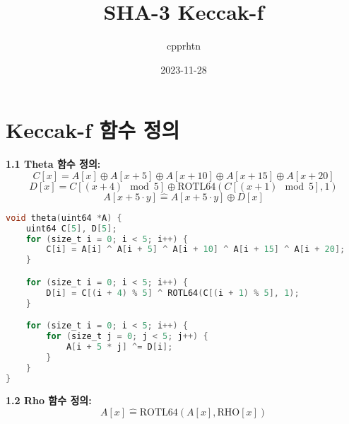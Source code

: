\documentclass[a4paper,12pt]{article} %
\title{SHA-3 \space{} Keccak-f}
\author{cpprhtn}
\date{2023-11-28} %
\begin{document}
\maketitle %

\section{Keccak-f 함수 정의} %
\vspace{2mm}


\textbf{1.1 Theta 함수 정의:}
\[
    C[x] = A[x] \oplus A[x + 5] \oplus A[x + 10] \oplus A[x + 15] \oplus A[x + 20]
\]
\[
    D[x] = C[(x + 4) \mod 5] \oplus \text{{ROTL64}}(C[(x + 1) \mod 5], 1)
\]
\[
    A[x + 5 \cdot y] \hat{=} A[x + 5 \cdot y] \oplus D[x]
\]

\begin{lstlisting}[language=C, caption={Theta 함수}]
void theta(uint64 *A) {
    uint64 C[5], D[5];
    for (size_t i = 0; i < 5; i++) {
        C[i] = A[i] ^ A[i + 5] ^ A[i + 10] ^ A[i + 15] ^ A[i + 20];
    }

    for (size_t i = 0; i < 5; i++) {
        D[i] = C[(i + 4) % 5] ^ ROTL64(C[(i + 1) % 5], 1);
    }

    for (size_t i = 0; i < 5; i++) {
        for (size_t j = 0; j < 5; j++) {
            A[i + 5 * j] ^= D[i];
        }
    }
}
\end{lstlisting}
\vspace{5mm}
\textbf{1.2 Rho 함수 정의:}
\[
    A[x] \hat{=} \text{{ROTL64}}(A[x], \text{{RHO}}[x])
\]
\end{document}
